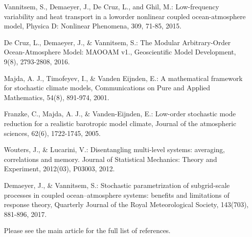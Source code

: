 \begin{DoxyItemize}
\item Vannitsem, S., Demaeyer, J., De Cruz, L., and Ghil, M.\+: Low-\/frequency variability and heat transport in a loworder nonlinear coupled ocean-\/atmosphere model, Physica D\+: Nonlinear Phenomena, 309, 71-\/85, 2015.
\item De Cruz, L., Demaeyer, J., \& Vannitsem, S.\+: The Modular Arbitrary-\/\+Order Ocean-\/\+Atmosphere Model\+: M\+A\+O\+O\+AM v1., Geoscientific Model Development, 9(8), 2793-\/2808, 2016.
\item Majda, A. J., Timofeyev, I., \& Vanden Eijnden, E.\+: A mathematical framework for stochastic climate models, Communications on Pure and Applied Mathematics, 54(8), 891-\/974, 2001.
\item Franzke, C., Majda, A. J., \& Vanden-\/\+Eijnden, E.\+: Low-\/order stochastic mode reduction for a realistic barotropic model climate, Journal of the atmospheric sciences, 62(6), 1722-\/1745, 2005.
\item Wouters, J., \& Lucarini, V.\+: Disentangling multi-\/level systems\+: averaging, correlations and memory. Journal of Statistical Mechanics\+: Theory and Experiment, 2012(03), P03003, 2012.
\item Demaeyer, J., \& Vannitsem, S.\+: Stochastic parametrization of subgrid‐scale processes in coupled ocean–atmosphere systems\+: benefits and limitations of response theory, Quarterly Journal of the Royal Meteorological Society, 143(703), 881-\/896, 2017.
\end{DoxyItemize}

Please see the main article for the full list of references. 